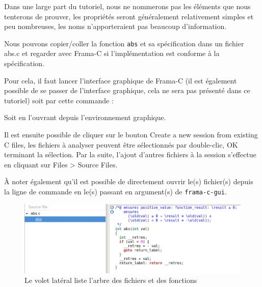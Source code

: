 \documentclass[12pt,francais,]{scrbook}
\newenvironment{Shaded}{}{}
\newcommand{\KeywordTok}[1]{\textcolor[rgb]{0.00,0.44,0.13}{\textbf{{#1}}}}
\newcommand{\NormalTok}[1]{{#1}}
\begin{document}
Dans une large part du tutoriel, nous ne nommerons pas les éléments que
nous tenterons de prouver, les propriétés seront généralement
relativement simples et peu nombreuses, les noms n'apporteraient pas
beaucoup d'information.

Nous pouvons copier/coller la fonction \texttt{abs} et sa spécification
dans un fichier abs.c et regarder avec Frama-C si l'implémentation est
conforme à la spécification.

Pour cela, il faut lancer l'interface graphique de Frama-C (il est
également possible de se passer de l'interface graphique, cela ne sera
pas présenté dans ce tutoriel) soit par cette commande :

\begin{footnotesize}\begin{Shaded}
\end{Shaded}\end{footnotesize}

Soit en l'ouvrant depuis l'environnement graphique.

Il est ensuite possible de cliquer sur le bouton \og{}Create a new session
from existing C files\fg{}, les fichiers à analyser peuvent être
sélectionnés par double-clic, OK terminant la sélection. Par la suite,
l'ajout d'autres fichiers à la session s'effectue en cliquant sur Files
\textgreater{} Source Files.

À noter également qu'il est possible de directement ouvrir le(s)
fichier(s) depuis la ligne de commande en le(s) passant en argument(s)
de \texttt{frama-c-gui}.

\begin{footnotesize}\begin{Shaded}
\end{Shaded}\end{footnotesize}

\begin{figure}[htbp]
\centering
\includegraphics[scale=0.5]{2-1-1-abs-1.png}
\caption{Le volet latéral liste l'arbre des fichiers et des fonctions}
\label{fig:2-1-1-abs-1}
\end{figure}
\end{document}
